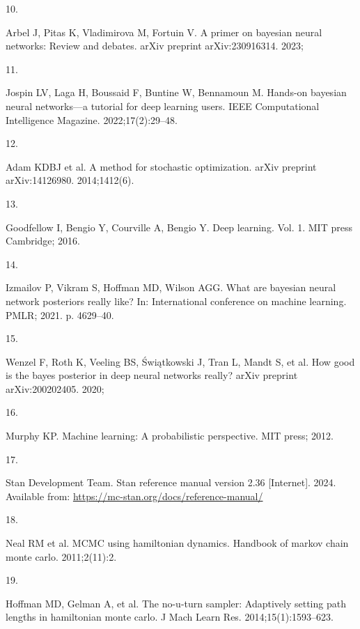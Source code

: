 \documentclass[
  a4paper,
]{scrreprt}
\newlength{\cslhangindent}
\newlength{\csllabelwidth}
\newenvironment{CSLReferences}[2] %
 {\begin{list}{}{%
  \setlength{\itemindent}{0pt}
  \setlength{\leftmargin}{0pt}
  \setlength{\parsep}{0pt}
  \ifodd #1
   \setlength{\leftmargin}{\cslhangindent}
   \setlength{\itemindent}{-1\cslhangindent}
  \fi
  \setlength{\itemsep}{#2\baselineskip}}}
 {\end{list}}
\newcommand{\CSLLeftMargin}[1]{\parbox[t]{\csllabelwidth}{\strut#1\strut}}
\newcommand{\CSLRightInline}[1]{\parbox[t]{\linewidth - \csllabelwidth}{\strut#1\strut}}
\begin{document}
\begin{CSLReferences}{0}{1}
\CSLLeftMargin{10. }%
\CSLRightInline{Arbel J, Pitas K, Vladimirova M, Fortuin V. A primer on
bayesian neural networks: Review and debates. arXiv preprint
arXiv:230916314. 2023; }

\CSLLeftMargin{11. }%
\CSLRightInline{Jospin LV, Laga H, Boussaid F, Buntine W, Bennamoun M.
Hands-on bayesian neural networks---a tutorial for deep learning users.
IEEE Computational Intelligence Magazine. 2022;17(2):29--48. }

\CSLLeftMargin{12. }%
\CSLRightInline{Adam KDBJ et al. A method for stochastic optimization.
arXiv preprint arXiv:14126980. 2014;1412(6). }

\CSLLeftMargin{13. }%
\CSLRightInline{Goodfellow I, Bengio Y, Courville A, Bengio Y. Deep
learning. Vol. 1. MIT press Cambridge; 2016. }

\CSLLeftMargin{14. }%
\CSLRightInline{Izmailov P, Vikram S, Hoffman MD, Wilson AGG. What are
bayesian neural network posteriors really like? In: International
conference on machine learning. PMLR; 2021. p. 4629--40. }

\CSLLeftMargin{15. }%
\CSLRightInline{Wenzel F, Roth K, Veeling BS, Świątkowski J, Tran L,
Mandt S, et al. How good is the bayes posterior in deep neural networks
really? arXiv preprint arXiv:200202405. 2020; }

\CSLLeftMargin{16. }%
\CSLRightInline{Murphy KP. Machine learning: A probabilistic
perspective. MIT press; 2012. }

\CSLLeftMargin{17. }%
\CSLRightInline{Stan Development Team. Stan reference manual version
2.36 {[}Internet{]}. 2024. Available from:
\url{https://mc-stan.org/docs/reference-manual/}}

\CSLLeftMargin{18. }%
\CSLRightInline{Neal RM et al. MCMC using hamiltonian dynamics. Handbook
of markov chain monte carlo. 2011;2(11):2. }

\CSLLeftMargin{19. }%
\CSLRightInline{Hoffman MD, Gelman A, et al. The no-u-turn sampler:
Adaptively setting path lengths in hamiltonian monte carlo. J Mach Learn
Res. 2014;15(1):1593--623. }


\end{CSLReferences}
\end{document}
